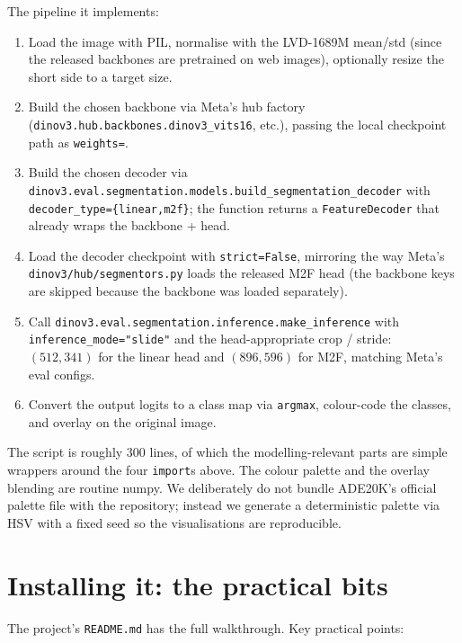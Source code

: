 \documentclass[11pt,a4paper]{article}
\begin{document}
The pipeline it implements:
\begin{enumerate}[leftmargin=1.6em,itemsep=0pt]
  \item Load the image with PIL, normalise with the LVD-1689M
        mean/std (since the released backbones are pretrained on web
        images), optionally resize the short side to a target size.
  \item Build the chosen backbone via Meta's hub factory
        (\texttt{dinov3.hub.backbones.dinov3\_vits16}, etc.), passing the
        local checkpoint path as \texttt{weights=}.
  \item Build the chosen decoder via
        \texttt{dinov3.eval.segmentation.models.build\_segmentation\_decoder}
        with \texttt{decoder\_type=\{linear,m2f\}}; the function returns
        a \texttt{FeatureDecoder} that already wraps the backbone + head.
  \item Load the decoder checkpoint with \texttt{strict=False}, mirroring
        the way Meta's \texttt{dinov3/hub/segmentors.py} loads the
        released M2F head (the backbone keys are skipped because the
        backbone was loaded separately).
  \item Call \texttt{dinov3.eval.segmentation.inference.make\_inference}
        with \texttt{inference\_mode="slide"} and the head-appropriate
        crop / stride: $(512, 341)$ for the linear head and $(896, 596)$
        for M2F, matching Meta's eval configs.
  \item Convert the output logits to a class map via \texttt{argmax},
        colour-code the classes, and overlay on the original image.
\end{enumerate}
The script is roughly 300 lines, of which the modelling-relevant parts
are simple wrappers around the four \texttt{import}s above. The colour
palette and the overlay blending are routine numpy. We deliberately do
not bundle ADE20K's official palette file with the repository; instead
we generate a deterministic palette via HSV with a fixed seed so the
visualisations are reproducible.

\section{Installing it: the practical bits}
\label{sec:install}

The project's \texttt{README.md} has the full walkthrough. Key practical
points:
\end{document}
